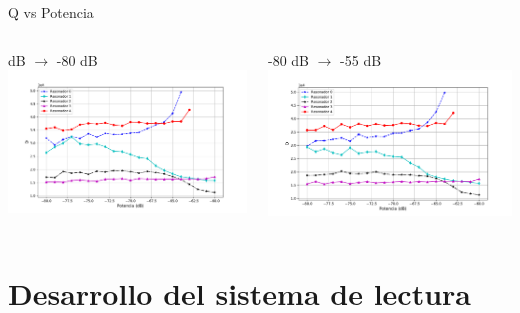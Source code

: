 \documentclass[ignorenonframetext,12pt]{beamer}
\begin{document}
\begin{frame}{Q vs Potencia}
			\begin{columns}
				\begin{column}{0.49\textwidth}
					\qquad {} dB $\to$ -80 dB
					\centering
					\includegraphics[height=0.45\textheight,width=1.1\textwidth]{Q_vs_P_tot_des}
				\end{column}
				\begin{column}{0.49\textwidth}
					-80 dB $\to$ -55 dB
					\centering
					\includegraphics[height=0.45\textheight,width=1.1\textwidth]{Q_vs_P_tot_asc}
				\end{column}
			\end{columns}

		\end{frame}

		\section{Desarrollo del sistema de lectura}
\end{document}
